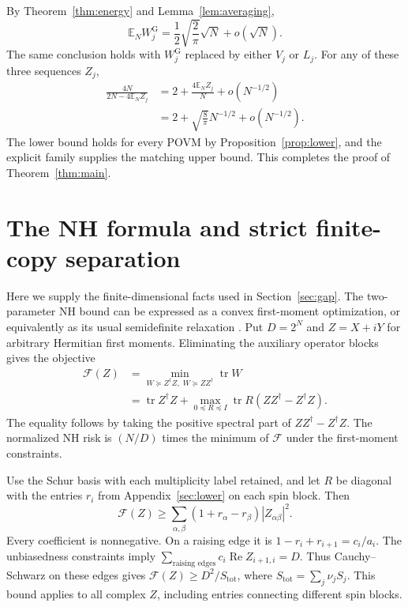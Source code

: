 \documentclass[aps,pra,reprint,superscriptaddress]{revtex4-2}
\theoremstyle{remark}
\DeclareMathOperator{\tr}{tr}
\newcommand{\E}{\mathbb E}
\newcommand{\g}{\mathrm G}
\begin{document}
By Theorem~\ref{thm:energy} and Lemma~\ref{lem:averaging},
\begin{equation}
 \E_N W_j^{\g}=\frac12\sqrt{\frac2\pi}\sqrt N+o(\sqrt N).
 \label{eq:averaged-W}
\end{equation}
The same conclusion holds with $W_j^{\g}$ replaced by either
$V_j$ or $L_j$. For any of these three sequences $Z_j$,
\begin{equation}
\begin{aligned}
\frac{4N}{2N-4\E_NZ_j}
 &=2+\frac{4\E_NZ_j}{N}+o(N^{-1/2})\\
 &=2+\sqrt{\frac8\pi}N^{-1/2}+o(N^{-1/2}).
\end{aligned}
\label{eq:risk-expansion}
\end{equation}
The lower bound holds for every POVM by
Proposition~\ref{prop:lower}, and the explicit family supplies the
matching upper bound. This completes the proof of
Theorem~\ref{thm:main}.


\section{The NH formula and strict finite-copy separation}\label{app:NH}
Here we supply the finite-dimensional facts used in
Section~\ref{sec:gap}. The two-parameter NH bound can be expressed
as a convex first-moment optimization, or equivalently as its usual
semidefinite relaxation \cite{HayashiOuyang2023,ZhangHayashi2026}.
Put $D=2^N$ and $Z=X+iY$ for arbitrary Hermitian first moments.
Eliminating the auxiliary operator blocks gives the objective
\[
\begin{aligned}
\mathcal F(Z)
 &=\min_{W\succeq Z^\dagger Z,\;W\succeq ZZ^\dagger}\tr W\\
 &=\tr Z^\dagger Z+
   \max_{0\preceq R\preceq I}\tr R(ZZ^\dagger-Z^\dagger Z).
\end{aligned}
\]
The equality follows by taking the positive spectral part of
$ZZ^\dagger-Z^\dagger Z$. The normalized NH risk is $(N/D)$ times
the minimum of $\mathcal F$ under the first-moment constraints.

Use the Schur basis with each multiplicity label retained, and let
$R$ be diagonal with the entries $r_i$ from Appendix~\ref{sec:lower}
on each spin block. Then
\[
 \mathcal F(Z)\geq
 \sum_{\alpha,\beta}(1+r_\alpha-r_\beta)|Z_{\alpha\beta}|^2.
\]
Every coefficient is nonnegative. On a raising edge it is
$1-r_i+r_{i+1}=c_i/a_i$. The unbiasedness constraints imply
$\sum_{\text{raising edges}}c_i\operatorname{Re}Z_{i+1,i}=D$.
Thus Cauchy--Schwarz on these edges gives
$\mathcal F(Z)\geq D^2/S_{\mathrm{tot}}$, where
$S_{\mathrm{tot}}=\sum_j\nu_jS_j$. This bound applies to all complex
$Z$, including entries connecting different spin blocks.
\end{document}
